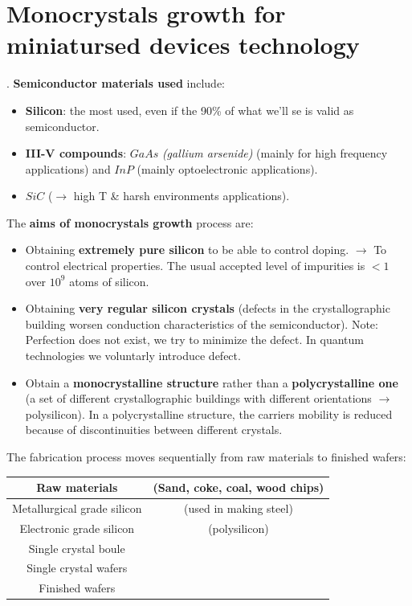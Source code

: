 \documentclass{report}
\begin{document}
\section{Monocrystals growth for miniatursed devices technology}.
\textbf{Semiconductor materials used} include:
\begin{itemize}
    \item \textbf{Silicon}: the most used, even if the 90\% of what we'll se is valid as semiconductor.
    \item \textbf{III-V compounds}: $GaAs$ \textit{(gallium arsenide)} (mainly for high frequency applications) and $InP$ (mainly optoelectronic applications).
    \item \textbf{$SiC$} ($\rightarrow$ high T \& harsh environments applications).
\end{itemize}
The \textbf{aims of monocrystals growth} process are:
\begin{itemize}
    \item Obtaining \textbf{extremely pure silicon} to be able to control doping. $\rightarrow$ To control electrical properties. The usual accepted level of impurities is $< 1$ over $10^9$ atoms of silicon.
    \item Obtaining \textbf{very regular silicon crystals} (defects in the crystallographic building worsen conduction characteristics of the semiconductor). Note: Perfection does not exist, we try to minimize the defect. In quantum technologies we voluntarly introduce defect.
    \item Obtain a \textbf{monocrystalline structure} rather than a \textbf{polycrystalline one} (a set of different crystallographic buildings with different orientations $\rightarrow$ polysilicon). In a polycrystalline structure, the carriers mobility is reduced because of discontinuities between different crystals.
\end{itemize}
The fabrication process moves sequentially from raw materials to finished wafers:
\begin{center}
\begin{tabular}{|c|c|}
\hline
Raw materials & (Sand, coke, coal, wood chips)\\
\hline
Metallurgical grade silicon  & (used in making steel)\\
\hline Electronic grade silicon  & (polysilicon)
\\ \hline Single crystal boule &
\\ \hline Single crystal wafers &
\\ \hline Finished wafers & \\ \hline

\end{tabular}
\end{center}
\end{document}
